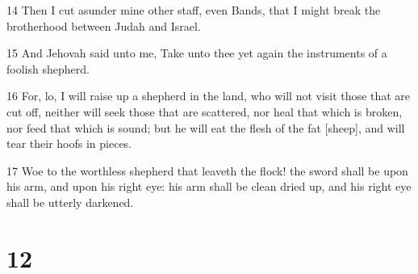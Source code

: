 \par 14 Then I cut asunder mine other staff, even Bands, that I might break the brotherhood between Judah and Israel.
\par 15 And Jehovah said unto me, Take unto thee yet again the instruments of a foolish shepherd.
\par 16 For, lo, I will raise up a shepherd in the land, who will not visit those that are cut off, neither will seek those that are scattered, nor heal that which is broken, nor feed that which is sound; but he will eat the flesh of the fat [sheep], and will tear their hoofs in pieces.
\par 17 Woe to the worthless shepherd that leaveth the flock! the sword shall be upon his arm, and upon his right eye: his arm shall be clean dried up, and his right eye shall be utterly darkened.

\chapter{12}

